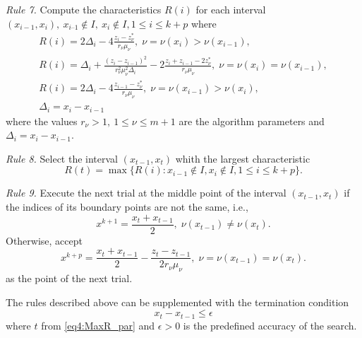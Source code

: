 \documentclass[graybox]{svmult}
\begin{document}
\emph{Rule 7.} Compute the characteristics $R(i)$ for each interval $(x_{i-1}, x_i ),\: x_{i – 1}\not\in I,\: x_i\not\in I, 1\le i\le k+p$ where
\begin{gather}
  R(i)=2\Delta_i-4\frac{z_i-z_\nu^\ast}{r_\nu \mu_\nu}, \; \nu=\nu(x_i)>\nu(x_{i-1}), \nonumber \\
  \label{eq4:characteristic_par}
  R(i)=\Delta_i+\frac{(z_i-z_{i-1})^2}{r_\nu^2 \mu_\nu^2\Delta_i}-2\frac{z_i+z_{i-1}-2z_\nu^\ast}{r_\nu \mu_\nu}, \;  \nu=\nu(x_i)=\nu(x_{i-1}),\\
  R(i)=2\Delta_i-4\frac{z_{i-1}-z_\nu^\ast}{r_\nu \mu_\nu}, \; \nu=\nu(x_{i-1})>\nu(x_i), \nonumber \\
  \Delta_i=x_i - x_{i-1} \nonumber
\end{gather}
where the values $r_\nu>1,\: 1\le\nu\le m+1$ are the algorithm parameters and $\Delta_i=x_i-x_{i-1}$.

\emph{Rule 8.} Select the interval $(x_{t-1},x_t )$ whith the largest characteristic
\begin{equation}
  \label{eq4:MaxR_par}
  R(t)=\max\{R(i):x_{i-1}\not\in I,x_{i}\not\in I,1\le i\le k+p\}.
\end{equation}

\emph{Rule 9.} Execute the next trial at the middle point of the interval $(x_{t-1},x_t )$ if the indices of its boundary points are not the same, i.e.,
\begin{equation}
  \label{eq4:next_point_1_par}
  x^{k+1} = \frac{x_t + x_{t-1}}{2}, \; \nu(x_{t-1}) \neq \nu(x_t).
\end{equation}
Otherwise, accept
\begin{equation}
\label{eq4:next_point_2_par}
x^{k+p} = \frac{x_t+x_{t-1}}{2} - \frac{z_t-z_{t-1}}{2r_\nu\mu_\nu},\; \nu=\nu(x_{t-1})=\nu(x_t).
\end{equation}
as the point of the next trial.

The rules described above can be supplemented with the termination condition
\begin{equation}
\label{eq4:stop_cond_par}
  x_t - x_{t-1}\le\epsilon
\end{equation}
where $t$ from \eqref{eq4:MaxR_par} and $\epsilon>0$ is the predefined accuracy of the search.
\end{document}
